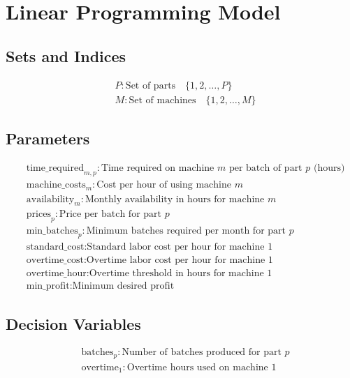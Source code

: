 \documentclass{article}
\begin{document}
\section*{Linear Programming Model}

\subsection*{Sets and Indices}
\begin{align*}
    & P: \text{Set of parts} \quad \{1, 2, \ldots, P\} \\
    & M: \text{Set of machines} \quad \{1, 2, \ldots, M\} 
\end{align*}

\subsection*{Parameters}
\begin{align*}
    & \text{time\_required}_{m,p}: \text{Time required on machine $m$ per batch of part $p$ (hours)} \\
    & \text{machine\_costs}_m: \text{Cost per hour of using machine $m$} \\
    & \text{availability}_m: \text{Monthly availability in hours for machine $m$} \\
    & \text{prices}_p: \text{Price per batch for part $p$} \\
    & \text{min\_batches}_p: \text{Minimum batches required per month for part $p$} \\
    & \text{standard\_cost}: \text{Standard labor cost per hour for machine 1} \\
    & \text{overtime\_cost}: \text{Overtime labor cost per hour for machine 1} \\
    & \text{overtime\_hour}: \text{Overtime threshold in hours for machine 1} \\
    & \text{min\_profit}: \text{Minimum desired profit}
\end{align*}

\subsection*{Decision Variables}
\begin{align*}
    & \text{batches}_p: \text{Number of batches produced for part $p$} \\
    & \text{overtime}_1: \text{Overtime hours used on machine 1}
\end{align*}
\end{document}
